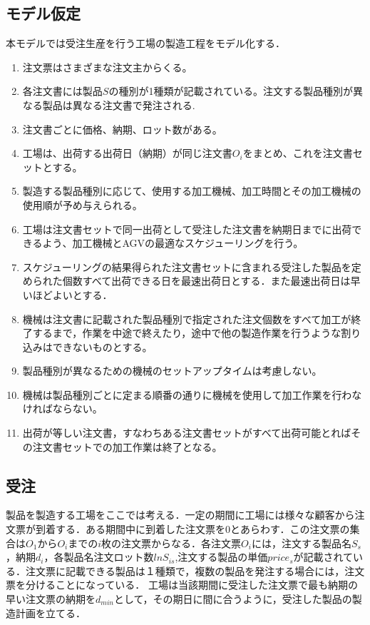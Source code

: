 \documentclass{jarticle}
\begin{document}
\subsection{モデル仮定}
本モデルでは受注生産を行う工場の製造工程をモデル化する．
\begin{enumerate}
    \item 注文票はさまざまな注文主からくる。
    \item 各注文書には製品$S$の種別が1種類が記載されている。注文する製品種別が異なる製品は異なる注文書で発注される.
    \item 注文書ごとに価格、納期、ロット数がある。
    \item 工場は、出荷する出荷日（納期）が同じ注文書$O_{\textit{i}}$をまとめ、これを注文書セットとする。
    \item 製造する製品種別に応じて、使用する加工機械、加工時間とその加工機械の使用順が予め与えられる。
    \item 工場は注文書セットで同一出荷として受注した注文書を納期日までに出荷できるよう、加工機械とAGVの最適なスケジューリングを行う。
    \item スケジューリングの結果得られた注文書セットに含まれる受注した製品を定められた個数すべて出荷できる日を最速出荷日とする．また最速出荷日は早いほどよいとする．
    \item 機械は注文書に記載された製品種別で指定された注文個数をすべて加工が終了するまで，作業を中途で終えたり，途中で他の製造作業を行うような割り込みはできないものとする。
    \item 製品種別が異なるための機械のセットアップタイムは考慮しない。
    \item 機械は製品種別ごとに定まる順番の通りに機械を使用して加工作業を行わなければならない。
    \item 出荷が等しい注文書，すなわちある注文書セットがすべて出荷可能とればその注文書セットでの加工作業は終了となる。
    \end{enumerate}

\subsection{受注}
製品を製造する工場をここでは考える．一定の期間に工場には様々な顧客から注文票が到着する．ある期間中に到着した注文票を$0$とあらわす．この注文票の集合は$O_1$から$O_i$までの$i$枚の注文票からなる．各注文票$O_i$には，注文する製品名$S_s$，納期$d_i$，各製品名注文ロット数$lnS_{is}$,注文する製品の単価$price_s$が記載されている．注文票に記載できる製品は１種類で，複数の製品を発注する場合には，注文票を分けることになっている．
工場は当該期間に受注した注文票で最も納期の早い注文票の納期を$d_{min}$として，その期日に間に合うように，受注した製品の製造計画を立てる．
\end{document}
